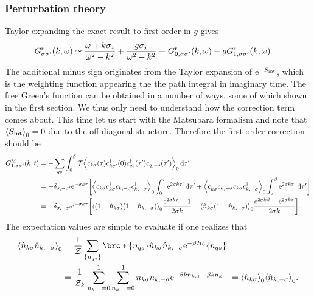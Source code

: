 \documentclass[english, parskip=full]{scrartcl}
\begin{document}
\subsubsection{Perturbation theory}
Taylor expanding the exact result to first order in $g$ gives
\begin{align}
G_{\sigma\sigma'}^\r(k,\omega) &\simeq \frac{\omega + k\sigma_z}{\omega^2 - k^2} + \frac{g\sigma_x}{\omega^2 - k^2} \equiv G_{0,\sigma\sigma'}^\r(k,\omega) - g G_{1,\sigma\sigma'}^\r(k,\omega).
\end{align}
The additional minus sign originates from the Taylor expansion of $\powe{-S_\Text{int}}$, which is the weighting function appearing the the path integral in imaginary time.
The free Green's function can be obtained in a number of ways, some of which shown in the first section.
We thus only need to understand how the correction term comes about.
This time let us start with the Matsubara formalism and note that $\bra*{S_\Text{int}}_0 = 0$ due to the off-diagonal structure.
Therefore the first order correction should be
\begin{align}
G_{1,\sigma\sigma'}^\M(k,t) &= - \sum_{qs} \intx{0}{\beta} {\mathcal{T} \bra*{c_{k\sigma}(\tau) c_{k\sigma'}^\dagger(0) c_{qs}^\dagger(\tau') c_{q,-s}(\tau')}_0}{\tau'}\\
&= -\delta_{\sigma,-\sigma'} \powe{-\sigma k\tau} \klb[\bigg]{\bra*{c_{k\sigma} c_{k\sigma}^\dagger c_{k,-\sigma} c_{k,-\sigma}^\dagger}_0 \intx{0}{\tau}{ \powe{2\sigma k\tau'} }{\tau'} + \bra*{c_{k\sigma}^\dagger c_{k,-\sigma} c_{k\sigma} c_{k,-\sigma}^\dagger}_0 \intx{\tau}{\beta}{ \powe{2\sigma k\tau'} }{\tau'}}\\
&= -\delta_{\sigma,-\sigma'} \powe{-\sigma k\tau} \klb*{\bra*{\kla*{1 - \hat{n}_{k\sigma}} \kla*{1 - \hat{n}_{k,-\sigma}}}_0 \frac{\powe{2\sigma k\tau} - 1}{2\sigma k} - \bra*{\hat{n}_{k\sigma} \kla*{1 - \hat{n}_{k,-\sigma}}}_0 \frac{\powe{2\sigma k\beta} - \powe{2\sigma k\tau}}{2\sigma k}}.
\end{align}
The expectation values are simple to evaluate if one realizes that
\begin{align}
\bra*{\hat{n}_{k\sigma} \hat{n}_{k,-\sigma}}_0 &= \frac{1}{\mathcal{Z}} \sum_{\klc*{n_{qs}}} \brc*{\klc*{n_{qs}}}{\hat{n}_{k\sigma} \hat{n}_{k,-\sigma} \powe{-\beta H_0}}{\klc*{n_{qs}}}\\
&= \frac{1}{\mathcal{Z}_k} \sum_{n_{k,+}=0}^1 \sum_{n_{k,-}=0}^1 n_{k\sigma} n_{k,-\sigma} \powe{-\beta k n_{k,+} + \beta k n_{k,-}} = \bra*{\hat{n}_{k\sigma}}_0\bra*{\hat{n}_{k,-\sigma}}_0.
\end{align}
\end{document}
